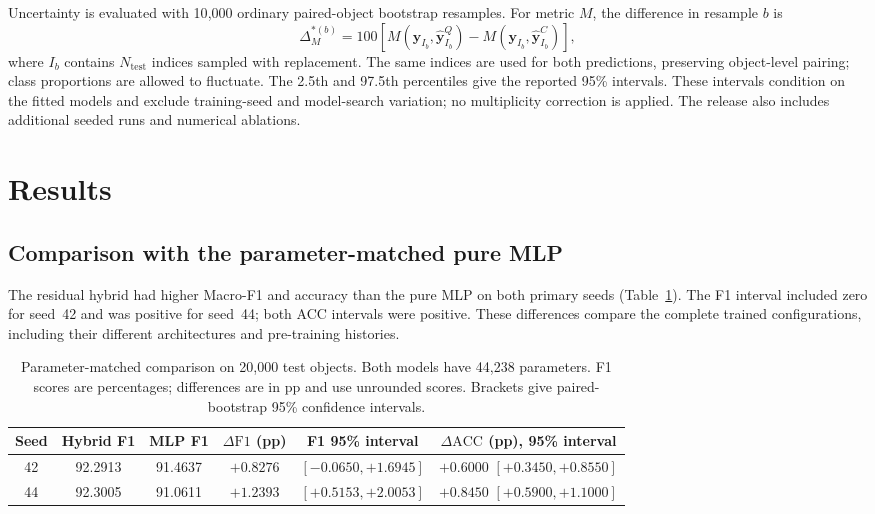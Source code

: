 \documentclass[aps,a4paper,onecolumn,11pt,unpublished]{quantumarticle}
\newcommand{\dF}{\Delta\mathrm{F1}}
\newcommand{\dA}{\Delta\mathrm{ACC}}
\begin{document}
Uncertainty is evaluated with 10{,}000 ordinary paired-object bootstrap resamples. For metric $M$, the difference in resample $b$ is
\begin{equation}
\Delta_M^{*(b)}=100\!\left[
M(\mathbf y_{I_b},\hat{\mathbf y}^{Q}_{I_b})-
M(\mathbf y_{I_b},\hat{\mathbf y}^{C}_{I_b})\right],
\label{eq:bootstrap}
\end{equation}
where $I_b$ contains $N_{\mathrm{test}}$ indices sampled with replacement. The same indices are used for both predictions, preserving object-level pairing; class proportions are allowed to fluctuate. The 2.5th and 97.5th percentiles give the reported 95\% intervals. These intervals condition on the fitted models and exclude training-seed and model-search variation; no multiplicity correction is applied. The release also includes additional seeded runs and numerical ablations.

\section{Results}

\subsection{Comparison with the parameter-matched pure MLP}
\label{sec:sameparameter}

The residual hybrid had higher Macro-F1 and accuracy than the pure MLP on both primary seeds (Table~\ref{tab:puremlp}). The F1 interval included zero for seed~42 and was positive for seed~44; both ACC intervals were positive. These differences compare the complete trained configurations, including their different architectures and pre-training histories.

\begin{table}[htbp]
\centering
\small
\setlength{\tabcolsep}{4pt}
\caption{Parameter-matched comparison on 20{,}000 test objects. Both models have 44{,}238 parameters. F1 scores are percentages; differences are in pp and use unrounded scores. Brackets give paired-bootstrap 95\% confidence intervals.}
\label{tab:puremlp}
\begin{tabular}{@{}cccccc@{}}
\toprule
Seed & Hybrid F1 & MLP F1 & $\dF$ (pp) & F1 95\% interval & $\dA$ (pp), 95\% interval \\
\midrule
42 & 92.2913 & 91.4637 & $+0.8276$ & $[-0.0650,+1.6945]$ & $+0.6000$ $[+0.3450,+0.8550]$ \\
44 & 92.3005 & 91.0611 & $+1.2393$ & $[+0.5153,+2.0053]$ & $+0.8450$ $[+0.5900,+1.1000]$ \\
\bottomrule
\end{tabular}
\end{table}
\end{document}
